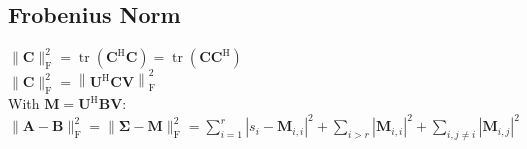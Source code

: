 \documentclass[english]{latex4ei/latex4ei_sheet}
\begin{document}
\begin{sectionbox}
  \subsection{Frobenius Norm}
  $\|\boldsymbol{C}\|_{\mathrm{F}}^{2}=\operatorname{tr}\left(\boldsymbol{C}^{\mathrm{H}} \boldsymbol{C}\right)=\operatorname{tr}\left(\boldsymbol{C}\boldsymbol{C}^{\mathrm{H}}\right)$\\
  $\|\boldsymbol{C}\|_{\mathrm{F}}^{2}=\left\|\boldsymbol{U}^{\mathrm{H}} \boldsymbol{C} \boldsymbol{V}\right\|_{\mathrm{F}}^{2}$\\
  With $\boldsymbol{M}=\boldsymbol{U}^{\mathrm{H}} \boldsymbol{B} \boldsymbol{V}$: \\
  $\|\boldsymbol{A}-\boldsymbol{B}\|_{\mathrm{F}}^{2}=\|\boldsymbol{\Sigma}-\boldsymbol{M}\|_{\mathrm{F}}^{2}=\sum_{i=1}^{r}\left|s_{i}-\boldsymbol{M}_{i, i}\right|^{2}+\sum_{i>r}\left|\boldsymbol{M}_{i, i}\right|^{2}+\sum_{i, j \neq i}\left|\boldsymbol{M}_{i, j}\right|^{2}$\\

\end{sectionbox}
\end{document}
